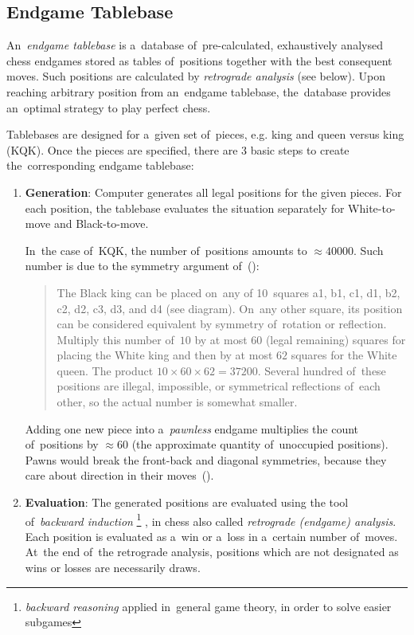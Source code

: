 \subsection{Endgame Tablebase}

An~\emph{endgame tablebase} is a~database of~pre-calculated, exhaustively analysed chess endgames stored as tables of~positions together with the best consequent moves.
Such positions are calculated by \emph{retrograde analysis} (see below).
Upon reaching arbitrary position from an~endgame tablebase, the~database provides an~optimal strategy to play perfect chess.

Tablebases are designed for a~given set of~pieces, e.g. king and queen versus king (KQK).
Once the pieces are specified, there are 3 basic steps to create the~corresponding endgame tablebase:
\begin{enumerate}[1]
  \item \textbf{Generation}:
    Computer generates all legal positions for the given pieces.
    For each position, the tablebase evaluates the situation separately for White-to-move and Black-to-move.

    In~the case of~KQK, the number of~positions amounts to $\approx 40000$.
    Such number is due to the symmetry argument of~(\cite{Levy2009computers}):

    \begin{quotation}
      The Black king can be placed on~any of 10~squares a1, b1, c1, d1, b2, c2, d2, c3, d3, and d4 (see \todo diagram).
      On~any other square, its position can be considered equivalent by symmetry of~rotation or reflection.
      Multiply this number of~$10$ by at most $60$ (legal remaining) squares for placing the White king and then by at most $62$ squares for the White queen.
      The product $10 \times 60 \times 62 = 37200$.
      Several hundred of~these positions are illegal, impossible, or symmetrical reflections of~each other, so the actual number is somewhat smaller.
    \end{quotation}

    Adding one new piece into a~\emph{pawnless} endgame multiplies the count of~positions by $\approx 60$ (the approximate quantity of~unoccupied positions).
    Pawns would break the front-back and diagonal symmetries, because they care about direction in their moves~(\cite{Muller2006EGTB}).

  \item \textbf{Evaluation}:
    The generated positions are evaluated using the tool of~\emph{backward induction}%
    \footnote{\emph{backward reasoning} applied in~general game theory, in order to solve easier subgames}
    , in chess also called \emph{retrograde (endgame) analysis}.
    Each position is evaluated as a~win or a~loss in a~certain number of~moves.
    At~the end of~the retrograde analysis, positions which are not designated as wins or losses are necessarily draws.


\end{enumerate}
